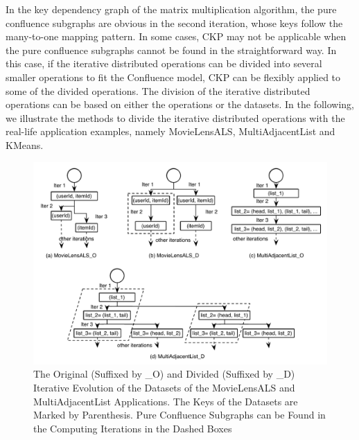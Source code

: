 \documentclass[10pt,journal,compsoc]{IEEEtran}
\begin{document}
In the key dependency graph of the matrix multiplication algorithm, 
the pure confluence subgraphs are obvious in the second iteration, 
whose keys follow the many-to-one mapping pattern.
In some cases, CKP may not be applicable when
the pure confluence subgraphs cannot be found
in the straightforward way.
In this case, if the iterative distributed operations can be divided into several smaller operations to fit the Confluence model, 
CKP can be flexibly applied to some of the divided operations.
The division of the iterative distributed operations can be based on either the operations or the datasets. 
In the following, we illustrate the methods to divide the iterative
distributed operations with the real-life application examples, 
namely MovieLensALS, MultiAdjacentList and KMeans.




\begin{figure}[!t]
\centering
\includegraphics[width=2\columnwidth]{figure4}
\caption{The Original (Suffixed by \_O) and Divided (Suffixed by \_D) Iterative Evolution of the Datasets of the MovieLensALS and MultiAdjacentList Applications. The Keys of the Datasets are Marked by Parenthesis. Pure Confluence Subgraphs can be Found in the Computing Iterations in the Dashed Boxes
}
\label{fig:alsDivision}
\end{figure}
\end{document}
